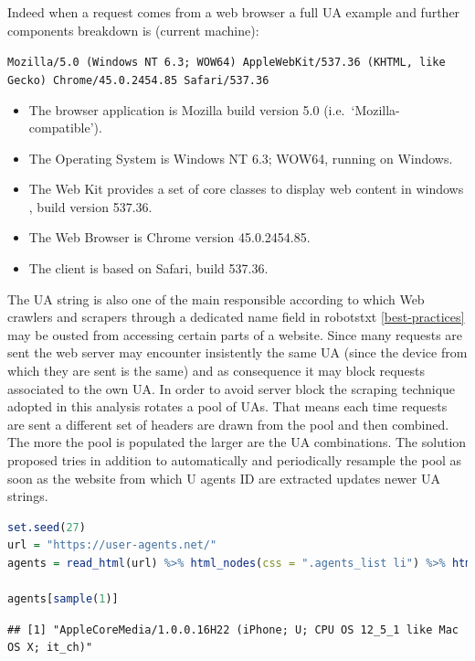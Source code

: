 \documentclass[
  12pt,
  a4paper,
  oneside]{book}
\newcommand{\passthrough}[1]{#1}
\providecommand{\tightlist}{%
  \setlength{\itemsep}{0pt}\setlength{\parskip}{0pt}}
\theoremstyle{definition}
\theoremstyle{definition}
\theoremstyle{definition}
\theoremstyle{remark}
\begin{document}
Indeed when a request comes from a web browser a full UA example and further components breakdown is (current machine):

\passthrough{\lstinline!Mozilla/5.0 (Windows NT 6.3; WOW64) AppleWebKit/537.36 (KHTML, like Gecko) Chrome/45.0.2454.85 Safari/537.36!}

\begin{itemize}
\tightlist
\item
  The browser application is Mozilla build version 5.0 (i.e.~`Mozilla-compatible').
\item
  The Operating System is Windows NT 6.3; WOW64, running on Windows.
\item
  The Web Kit provides a set of core classes to display web content in windows \citep{UserAgen23}, build version 537.36.
\item
  The Web Browser is Chrome version 45.0.2454.85.
\item
  The client is based on Safari, build 537.36.
\end{itemize}

The UA string is also one of the main responsible according to which Web crawlers and scrapers through a dedicated name field in robotstxt \ref{best-practices} may be ousted from accessing certain parts of a website. Since many requests are sent the web server may encounter insistently the same UA (since the device from which they are sent is the same) and as consequence it may block requests associated to the own UA. In order to avoid server block the scraping technique adopted in this analysis rotates a pool of UAs. That means each time requests are sent a different set of headers are drawn from the pool and then combined. The more the pool is populated the larger are the UA combinations. The solution proposed tries in addition to automatically and periodically resample the pool as soon as the website from which U agents ID are extracted updates newer UA strings.

\begin{lstlisting}[language=R]
set.seed(27)
url = "https://user-agents.net/"
agents = read_html(url) %>% html_nodes(css = ".agents_list li") %>% html_text()

agents[sample(1)]
\end{lstlisting}

\begin{lstlisting}
## [1] "AppleCoreMedia/1.0.0.16H22 (iPhone; U; CPU OS 12_5_1 like Mac OS X; it_ch)"
\end{lstlisting}
\end{document}
